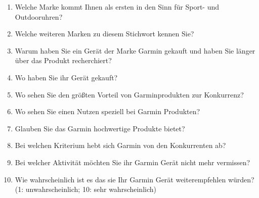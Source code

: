 \begin{enumerate} \label{tab:fragebogen}
    \item Welche Marke kommt Ihnen als ersten in den Sinn für Sport- und Outdooruhren?
    \item Welche weiteren Marken zu diesem Stichwort kennen Sie?
    \item Warum haben Sie ein Gerät der Marke Garmin gekauft und haben Sie länger über das Produkt recherchiert?
    \item Wo haben Sie ihr Gerät gekauft?
    \item Wo sehen Sie den größten Vorteil von Garminprodukten zur Konkurrenz?
    \item Wo sehen Sie einen Nutzen speziell bei Garmin Produkten?
    \item Glauben Sie das Garmin hochwertige Produkte bietet?
    \item Bei welchen Kriterium hebt sich Garmin von den Konkurrenten ab?
    \item Bei welcher Aktivität möchten Sie ihr Garmin Gerät nicht mehr vermissen?
    \item Wie wahrscheinlich ist es das sie Ihr Garmin Gerät weiterempfehlen würden? \\
    (1: unwahrscheinlich; 10: sehr wahrscheinlich)
\end{enumerate}